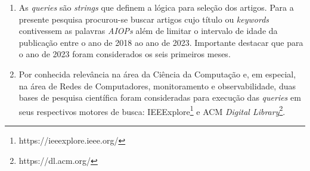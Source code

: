 \begin{enumerate}
    
    \item As \textit{queries} são \textit{strings} que definem a lógica para seleção dos artigos. Para a presente pesquisa procurou-se buscar artigos cujo título ou \textit{keywords} contivessem as palavras \textit{AIOPs} além de limitar o intervalo de idade da publicação entre o ano de 2018 ao ano de 2023. Importante destacar que para o ano de 2023 foram considerados os seis primeiros meses.
    
    \item Por conhecida relevância na área da Ciência da Computação e, em especial, na área de Redes de Computadores, monitoramento e observabilidade, duas bases de pesquisa científica foram consideradas para execução das \textit{queries} em seus respectivos motores de busca: IEEExplore\footnote{https://ieeexplore.ieee.org/} e ACM \textit{Digital Library}\footnote{https://dl.acm.org/}.
    

\end{enumerate}
